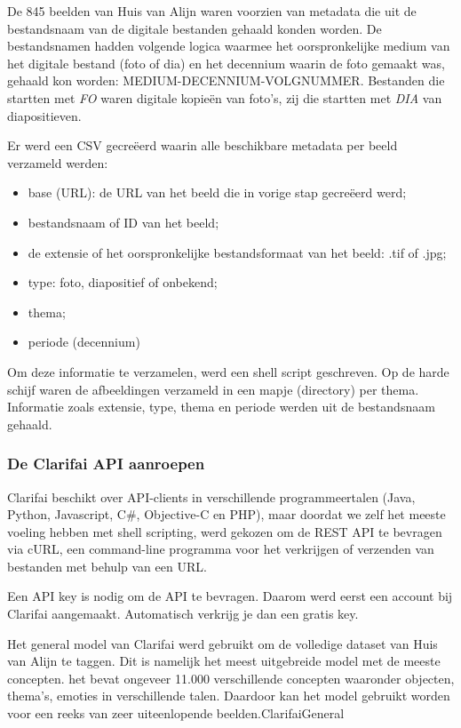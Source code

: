 De 845 beelden van Huis van Alijn waren voorzien van metadata die uit de bestandsnaam van de digitale bestanden gehaald konden worden. De bestandsnamen hadden volgende logica waarmee het oorspronkelijke medium van het digitale bestand (foto of dia) en het decennium waarin de foto gemaakt was, gehaald kon worden: MEDIUM-DECENNIUM-VOLGNUMMER. Bestanden die startten met \textit{FO} waren digitale kopieën van foto’s, zij die startten met \textit{DIA} van diapositieven. 

Er werd een CSV gecreëerd waarin alle beschikbare metadata per beeld verzameld werden:
\begin{itemize}
	\item base (URL): de URL van het beeld die in vorige stap gecreëerd werd;
	\item bestandsnaam of ID van het beeld;
	\item de extensie of het oorspronkelijke bestandsformaat van het beeld: .tif of .jpg;
	\item type: foto, diapositief of onbekend;
	\item thema;
	\item periode (decennium)
\end{itemize}

Om deze informatie te verzamelen, werd een shell script geschreven. Op de harde schijf waren de afbeeldingen verzameld in een mapje (directory) per thema. Informatie zoals extensie, type, thema en periode werden uit de bestandsnaam gehaald. 

\subsubsection{De Clarifai API aanroepen}

Clarifai beschikt over API-clients in verschillende programmeertalen (Java, Python, Javascript, C\#, Objective-C en PHP), maar doordat we zelf het meeste voeling hebben met shell scripting, werd gekozen om de REST API te bevragen via cURL, een command-line programma voor het verkrijgen of verzenden van bestanden met behulp van  een URL.

Een API key is nodig om de API te bevragen. Daarom werd eerst een account bij Clarifai aangemaakt. Automatisch verkrijg je dan een gratis key. 


Het general model van Clarifai werd gebruikt om de volledige dataset van Huis van Alijn te taggen. Dit is namelijk het meest uitgebreide model met de meeste concepten. het bevat ongeveer 11.000 verschillende concepten waaronder objecten, thema's, emoties in verschillende talen. Daardoor kan het model gebruikt worden voor een reeks van zeer uiteenlopende beelden.{ClarifaiGeneral}

